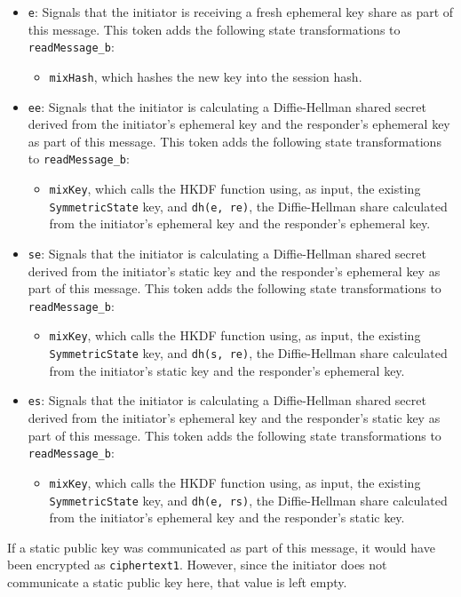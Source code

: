 \begin{itemize}

\item \texttt{e}: Signals that the initiator is receiving a fresh ephemeral key share as part of this message. This token adds the following state transformations to \texttt{readMessage\_b}:
\begin{itemize}

\item \texttt{mixHash}, which hashes the new key into the session hash.
\end{itemize}


\item \texttt{ee}: Signals that the initiator is calculating a Diffie-Hellman shared secret derived from the initiator's ephemeral key and the responder's ephemeral key as part of this message. This token adds the following state transformations to \texttt{readMessage\_b}:
\begin{itemize}

\item \texttt{mixKey}, which calls the HKDF function using, as input, the existing \texttt{SymmetricState} key, and \texttt{dh(e, re)}, the Diffie-Hellman share calculated from the initiator's ephemeral key and the responder's ephemeral key.
\end{itemize}


\item \texttt{se}: Signals that the initiator is calculating a Diffie-Hellman shared secret derived from the initiator's static key and the responder's ephemeral key as part of this message. This token adds the following state transformations to \texttt{readMessage\_b}:
\begin{itemize}

\item \texttt{mixKey}, which calls the HKDF function using, as input, the existing \texttt{SymmetricState} key, and \texttt{dh(s, re)}, the Diffie-Hellman share calculated from the initiator's static key and the responder's ephemeral key.
\end{itemize}


\item \texttt{es}: Signals that the initiator is calculating a Diffie-Hellman shared secret derived from the initiator's ephemeral key and the responder's static key as part of this message. This token adds the following state transformations to \texttt{readMessage\_b}:
\begin{itemize}

\item \texttt{mixKey}, which calls the HKDF function using, as input, the existing \texttt{SymmetricState} key, and \texttt{dh(e, rs)}, the Diffie-Hellman share calculated from the initiator's ephemeral key and the responder's static key.
\end{itemize}


\end{itemize}
If a static public key was communicated as part of this message, it would have been encrypted as \texttt{ciphertext1}. However, since the initiator does not communicate a static public key here, that value is left empty.



